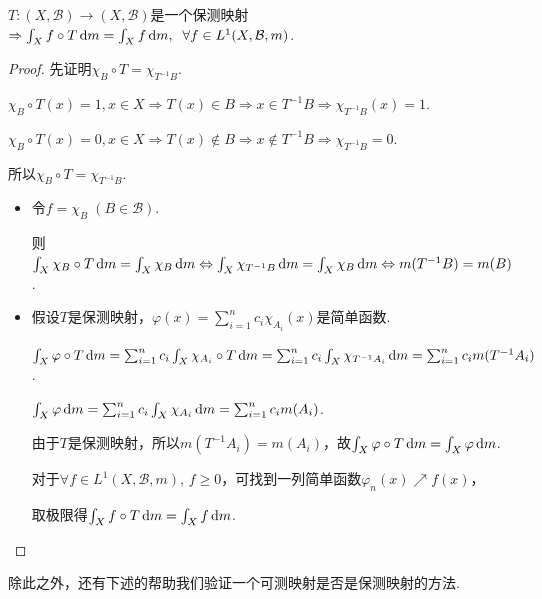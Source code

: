 \begin{proposition}[保测映射的等价刻画]
    $T:(X,\mathcal{B}) \to (X,\mathcal{B})$是一个保测映射$\Rightarrow \int_X{f\circ T}\mathop{}\!\mathrm{d} m=\int_X{f}\mathop{}\!\mathrm{d} m, \;\; \forall f\in L^1(X,\mathcal{B},m)$.
\end{proposition}
\begin{proof}
    先证明$\chi_B\circ T=\chi_{T^{-1}B}$.\par
    $\chi_B\circ T(x)=1,x\in X \Rightarrow T(x)\in B \Rightarrow x\in T^{-1}B \Rightarrow \chi_{T^{-1}B}(x)=1$. \par
    $\chi_B\circ T(x)=0,x\in X \Rightarrow T(x)\notin B \Rightarrow x\notin T^{-1}B \Rightarrow \chi_{T^{-1}B}=0$.\par
    所以$\chi_B\circ T=\chi_{T^{-1}B}$.\par
    \begin{itemize}[leftmargin=3.5em]
        \item[“$\Leftarrow$”] 令$f=\chi_B\;(B\in\mathcal{B})$.\par
        则$\int_X{\chi_B\circ T}\mathop{}\!\mathrm{d} m=\int_X{\chi_B}\mathop{}\!\mathrm{d} m \Leftrightarrow \int_X{\chi_{T^{-1}B}}\mathop{}\!\mathrm{d} m=\int_X{\chi_B}\mathop{}\!\mathrm{d} m \Leftrightarrow m(T^{-1}B)=m(B)$.\par
        \item[“$\Rightarrow$”] 假设$T$是保测映射，$\varphi(x)=\sum_{i=1}^n{c_i\chi_{A_i}(x)}$是简单函数.\par
        $\int_X{\varphi\circ T}\mathop{}\!\mathrm{d} m = \sum_{i=1}^n{c_i\int_X{\chi_{A_i}\circ T}\mathop{}\!\mathrm{d} m} = \sum_{i=1}^n{c_i\int_X{\chi_{T^{-1}A_i}}\mathop{}\!\mathrm{d} m} = \sum_{i=1}^n{c_i m(T^{-1}A_i)}$.\par
        $\int_X{\varphi}\mathop{}\!\mathrm{d} m=\sum_{i=1}^n{c_i\int_X{\chi_{A_i}}\mathop{}\!\mathrm{d} m} =\sum_{i=1}^n{c_i m(A_i)}$.\par
        由于$T$是保测映射，所以$m(T^{-1}A_i)=m(A_i)$，故$\int_X{\varphi\circ T}\mathop{}\!\mathrm{d} m=\int_X{\varphi}\mathop{}\!\mathrm{d} m$.\par
        对于$\forall f\in L^1(X,\mathcal{B},m),\, f\geq 0$，可找到一列简单函数$\varphi_n(x)\nearrow f(x)$，\par
        取极限得$\int_X{f\circ T}\mathop{}\!\mathrm{d} m=\int_X{f}\mathop{}\!\mathrm{d} m$.\qedhere
    \end{itemize}
\end{proof}

除此之外，还有下述的帮助我们验证一个可测映射是否是保测映射的方法.

